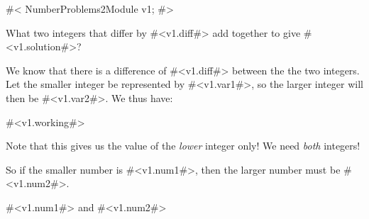 

#<
NumberProblems2Module v1;
#>

What two integers that differ by #<v1.diff#> add together to give #<v1.solution#>?

We know that there is a difference of #<v1.diff#> between the the two
integers.  Let the smaller integer be represented by #<v1.var1#>, so
the larger integer will then be #<v1.var2#>.  We thus have:

#<v1.working#>

Note that this gives us the value of the \emph{lower} integer only!
We need \emph{both} integers!

So if the smaller number is #<v1.num1#>, then the larger number must
be #<v1.num2#>.

#<v1.num1#> and #<v1.num2#>


